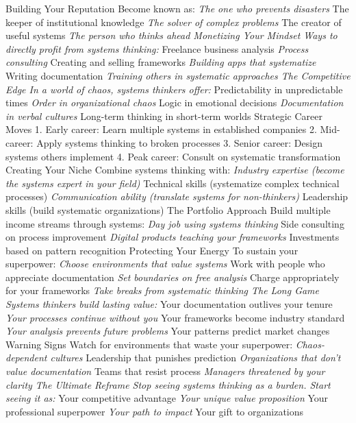 \documentclass[12pt]{book}
\begin{document}
Building Your Reputation
Become known as:
\textit{ The one who prevents disasters
} The keeper of institutional knowledge
\textit{ The solver of complex problems
} The creator of useful systems
\textit{ The person who thinks ahead
Monetizing Your Mindset
Ways to directly profit from systems thinking:
} Freelance business analysis
\textit{ Process consulting
} Creating and selling frameworks
\textit{ Building apps that systematize
} Writing documentation
\textit{ Training others in systematic approaches
The Competitive Edge
In a world of chaos, systems thinkers offer:
} Predictability in unpredictable times
\textit{ Order in organizational chaos
} Logic in emotional decisions
\textit{ Documentation in verbal cultures
} Long-term thinking in short-term worlds
Strategic Career Moves
1. Early career: Learn multiple systems in established companies
2. Mid-career: Apply systems thinking to broken processes
3. Senior career: Design systems others implement
4. Peak career: Consult on systematic transformation
Creating Your Niche
Combine systems thinking with:
\textit{ Industry expertise (become the systems expert in your field)
} Technical skills (systematize complex technical processes)
\textit{ Communication ability (translate systems for non-thinkers)
} Leadership skills (build systematic organizations)
The Portfolio Approach
Build multiple income streams through systems:
\textit{ Day job using systems thinking
} Side consulting on process improvement
\textit{ Digital products teaching your frameworks
} Investments based on pattern recognition
Protecting Your Energy
To sustain your superpower:
\textit{ Choose environments that value systems
} Work with people who appreciate documentation
\textit{ Set boundaries on free analysis
} Charge appropriately for your frameworks
\textit{ Take breaks from systematic thinking
The Long Game
Systems thinkers build lasting value:
} Your documentation outlives your tenure
\textit{ Your processes continue without you
} Your frameworks become industry standard
\textit{ Your analysis prevents future problems
} Your patterns predict market changes
Warning Signs
Watch for environments that waste your superpower:
\textit{ Chaos-dependent cultures
} Leadership that punishes prediction
\textit{ Organizations that don't value documentation
} Teams that resist process
\textit{ Managers threatened by your clarity
The Ultimate Reframe
Stop seeing systems thinking as a burden. Start seeing it as:
} Your competitive advantage
\textit{ Your unique value proposition
} Your professional superpower
\textit{ Your path to impact
} Your gift to organizations
\end{document}
